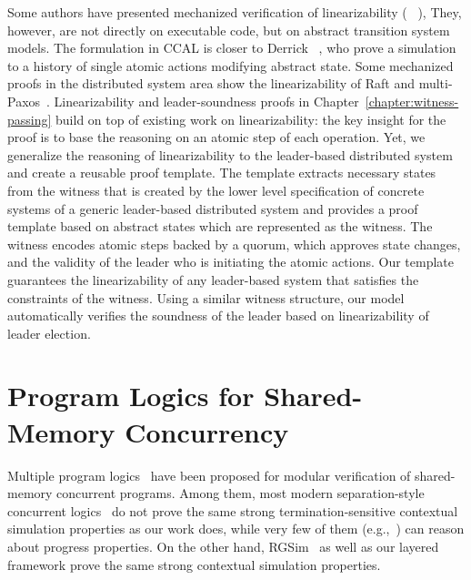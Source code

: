 Some
authors have presented mechanized verification of linearizability
(\eg~ \cite{DGLMQueue,DerrickSW11}),
They, however, are not directly on executable
code, but on abstract transition system models.
The formulation in CCAL is closer to Derrick \etal~\cite{DerrickSW11}, who prove a simulation
to a history of single atomic actions modifying abstract state.  
Some mechanized proofs in the distributed system area show 
the linearizability of Raft and
multi-Paxos~\cite{cppraft, ironfleet}.
%
Linearizability
and leader-soundness proofs in Chapter~\ref{chapter:witness-passing} build on top of existing work on
linearizability: the key insight for the proof is to base the reasoning on
an atomic step of each operation.  Yet, we generalize the reasoning of linearizability
to the leader-based distributed system and create a reusable proof template.
The template extracts
necessary states from the witness that is created by the lower level
specification of concrete systems
of a generic leader-based distributed system and provides a proof template based on
abstract states which are represented as the witness.
The witness encodes atomic steps backed by a quorum, which approves state
changes, and the validity of the leader who is initiating the atomic actions.
Our template guarantees the linearizability of any leader-based system that
satisfies the constraints of the witness. Using a similar witness structure, our
model automatically verifies the soundness of the leader based on
linearizability of leader election.




\section{Program Logics for Shared-Memory Concurrency}
Multiple program  logics~
\cite{cap10, ohearn:concur04,brookes:concur04,feng07:sagl,vafeiadis:marriage,LRG,verifast,gotsman13,Turon13popl,Turon13icfp,nanevski13,nanevski14,
sergey15,sergey15pldi,pinto14,iris15,civl15,pinto16,xu16}
have been proposed for 
modular verification of shared-memory concurrent programs. 
Among them, most modern separation-style concurrent logics~
\cite{cap10,Turon13popl,sergey15pldi,pinto14,iris15,pinto16} do
not prove the same strong termination-sensitive contextual simulation
properties as our work does,
while very few of them (e.g.,~\cite{pinto16})
can reason about progress properties.
On the other hand,
RGSim~\cite{RGSim} as well as our layered framework prove the same strong contextual simulation properties.

